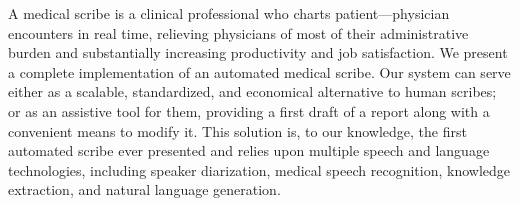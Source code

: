 A medical scribe is a clinical professional who charts patient---physician encounters in real time, relieving physicians of most of their administrative burden and substantially increasing productivity and job satisfaction. We present a complete implementation of an automated medical scribe. Our system can serve either as a scalable, standardized, and economical alternative to human scribes; or as an assistive tool for them, providing a first draft of a report along with a convenient means to modify it. This solution is, to our knowledge, the first automated scribe ever presented and relies upon multiple speech and language technologies, including speaker diarization, medical speech recognition, knowledge extraction, and natural language generation.
